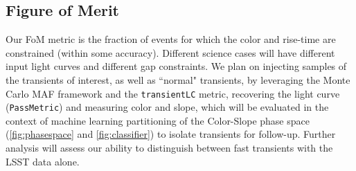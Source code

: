 \documentclass[letterpaper,longauthor,trackchanges,twocolumn,onecolappendix,sort&compress]{aastex62}
\begin{document}
\subsection{Figure of Merit}

Our FoM metric is the fraction of events for which the color and rise-time are constrained (within some accuracy). Different science cases will have different input light curves and different gap constraints. We plan on injecting samples of the transients of interest, as well as ``normal" transients, by leveraging the Monte Carlo MAF framework and the {\tt transientLC} metric, recovering the light curve ({\tt PassMetric}) and measuring color and slope, which will be evaluated in the context of  machine learning partitioning of the Color-Slope phase space (\autoref{fig:phasespace} and \autoref{fig:classifier}) to isolate transients for follow-up. Further analysis will assess our ability to distinguish between fast transients with the LSST data alone.



%

%
\end{document}
